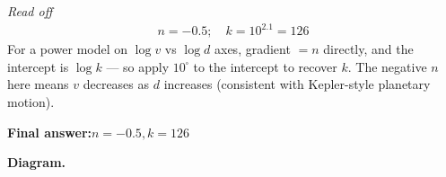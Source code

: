 \documentclass[11pt]{article}
\begin{document}
\textit{Read off}
\[\begin{gathered}
n = -0.5; \quad k = 10^{2.1} = 126
\end{gathered}\]
For a power model on \( \log v \) vs \( \log d \) axes, gradient \( = n \) directly, and the intercept is \( \log k \) --- so apply \( 10^{\square} \) to the intercept to recover \( k \). The negative \( n \) here means \( v \) decreases as \( d \) increases (consistent with Kepler-style planetary motion).

\begin{answerbox}
\textbf{Final answer:}\quad \(\displaystyle n = -0.5, k = 126\)
\end{answerbox}
\textbf{Diagram.}

\begin{center}
\end{center}
\end{document}
